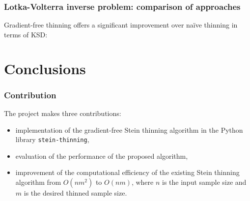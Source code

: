 \documentclass{beamer}
\begin{document}
\begin{frame}
\frametitle{Lotka-Volterra inverse problem: comparison of approaches}

Gradient-free thinning offers a significant improvement over na\"ive thinning in terms of KSD:

\begin{figure}[h]
\centering
{}
\end{figure}

\end{frame}

\section{Conclusions}

\begin{frame}
\frametitle{Contribution}

The project makes three contributions:
\begin{itemize}
\item implementation of the gradient-free Stein thinning algorithm in the Python library \texttt{stein-thinning},
\item evaluation of the performance of the proposed algorithm,
\item improvement of the computational efficiency of the existing Stein thinning algorithm from $O(nm^2)$ to $O(nm)$, where $n$ is the input sample size and $m$ is the desired thinned sample size.
\end{itemize}

\end{frame}
\end{document}
